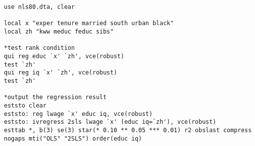 \begin{lstlisting}
use nls80.dta, clear

local x "exper tenure married south urban black"
local zh "kww meduc feduc sibs"

*test rank condition
qui reg educ `x' `zh', vce(robust)
test `zh'
qui reg iq `x' `zh', vce(robust)
test `zh'

*output the regression result
eststo clear
eststo: reg lwage `x' educ iq, vce(robust)
eststo: ivregress 2sls lwage `x' (educ iq=`zh'), vce(robust)
esttab *, b(3) se(3) star(* 0.10 ** 0.05 *** 0.01) r2 obslast compress nogaps mti("OLS" "2SLS") order(educ iq)
\end{lstlisting}